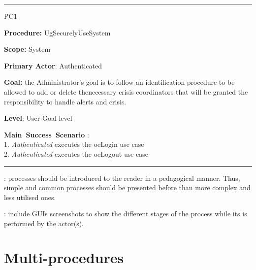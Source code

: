 \vspace{0.5cm}
\hrule
\begin{lyxlist}{PC1}
\small{
\item [\textbf{Procedure:}] UgSecurelyUseSystem
\item [\textbf{Scope:}] System
\item [\textbf{Primary Actor}:] Authenticated
\item [\textbf{Goal:}] the Administrator’s goal is to follow an identification procedure to be allowed to add or delete thenecessary crisis coordinators that will be granted the responsibility to handle alerts and crisis.
\item [\textbf{Level}:] User-Goal level
\item [\textbf{Main~Success~Scenario}]:\\
1. \emph{Authenticated} executes the oeLogin use case\\
2. \emph{Authenticated} executes the oeLogout use case\\
}

\end{lyxlist}
\hrule
\vspace{0.5cm}


: processes should be introduced to the
reader in a pedagogical manner. Thus, simple and common processes should be presented before
than more complex and less utilised ones.

: include GUIs screenshots to show the
different stages of the process while its is performed by the actor(s).






\section{Multi-procedures}


